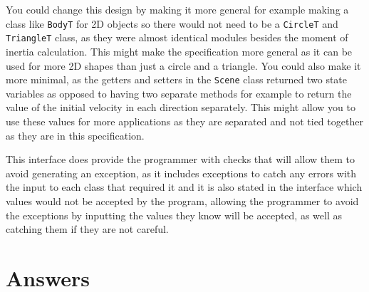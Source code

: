 \documentclass[12pt]{article}
\begin{document}
You could change this design by making it more general for example making a class like 
\verb|BodyT| for 2D objects so there would not need to be a \verb|CircleT| and \verb|TriangleT| 
class, as they were almost identical modules besides the moment of inertia calculation. This 
might make the specification more general as it can be used for more 2D shapes than just a circle
and a triangle. You could also make it more minimal, as the getters and setters in the 
\verb|Scene| class returned two state variables as opposed to having two separate methods for 
example to return the value of the initial velocity in each direction separately. This might 
allow you to use these values for more applications as they are separated and not tied together 
as they are in this specification.

This interface does provide the programmer with checks that will allow them to avoid generating 
an exception, as it includes exceptions to catch any errors with the input to each class that 
required it and it is also stated in the interface which values would not be accepted by the 
program, allowing the programmer to avoid the exceptions by inputting the values they know will 
be accepted, as well as catching them if they are not careful. 

\section{Answers}
\end{document}
